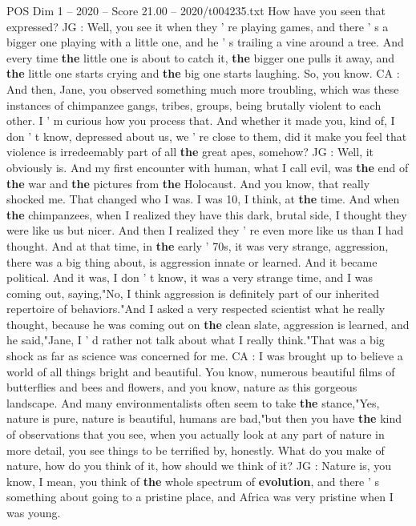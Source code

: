 \begin{textsample}{POS Dim 1 – 2020 – Score 21.00 – 2020/t004235.txt}
How have you seen that expressed?
JG : Well, you see it when they ' re playing games, and there ' s a bigger one playing with a little one, and he ' s trailing a vine around a tree.
And every time \textbf{the} little one is about to catch it, \textbf{the} bigger one pulls it away, and \textbf{the} little one starts crying and \textbf{the} big one starts laughing.
So, you know.
CA : And then, Jane, you observed something much more troubling, which was these instances of chimpanzee gangs, tribes, groups, being brutally violent to each other.
I ' m curious how you process that.
And whether it made you, kind of, I don ' t know, depressed about us, we ' re close to them, did it make you feel that violence is irredeemably part of all \textbf{the} great apes, somehow?
JG : Well, it obviously is.
And my first encounter with human, what I call evil, was \textbf{the} end of \textbf{the} war and \textbf{the} pictures from \textbf{the} Holocaust.
And you know, that really shocked me.
That changed who I was.
I was 10, I think, at \textbf{the} time.
And when \textbf{the} chimpanzees, when I realized they have this dark, brutal side, I thought they were like us but nicer.
And then I realized they ' re even more like us than I had thought.
And at that time, in \textbf{the} early ' 70s, it was very strange, aggression, there was a big thing about, is aggression innate or learned.
And it became political.
And it was, I don ' t know, it was a very strange time, and I was coming out, saying,"No, I think aggression is definitely part of our inherited repertoire of behaviors."And I asked a very respected scientist what he really thought, because he was coming out on \textbf{the} clean slate, aggression is learned, and he said,"Jane, I ' d rather not talk about what I really think."That was a big shock as far as science was concerned for me.
CA : I was brought up to believe a world of all things bright and beautiful.
You know, numerous beautiful films of butterflies and bees and flowers, and you know, nature as this gorgeous landscape.
And many environmentalists often seem to take \textbf{the} stance,"Yes, nature is pure, nature is beautiful, humans are bad,"but then you have \textbf{the} kind of observations that you see, when you actually look at any part of nature in more detail, you see things to be terrified by, honestly.
What do you make of nature, how do you think of it, how should we think of it?
JG : Nature is, you know, I mean, you think of \textbf{the} whole spectrum of \textbf{evolution}, and there ' s something about going to a pristine place, and Africa was very pristine when I was young.

\end{textsample}
